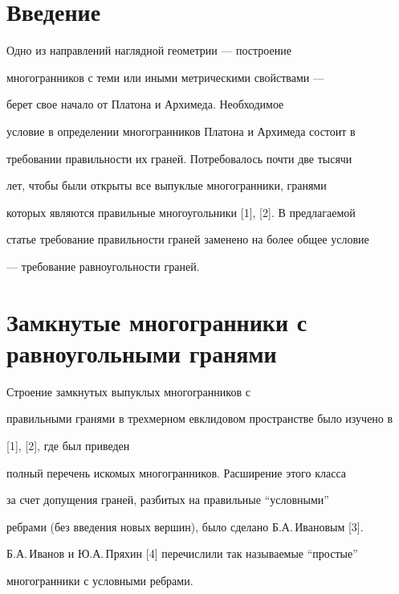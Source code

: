 \label{begin} 


 


\section*{Введение} 


 


Одно из направлений наглядной геометрии --- построение 


многогранников с теми или иными метрическими свойствами --- 


берет свое начало от Платона и Архимеда. Необходимое 


условие в определении многогранников Платона и Архимеда состоит в 


требовании правильности их граней. Потребовалось почти две тысячи 


лет, чтобы были открыты все выпуклые многогранники, гранями 


которых являются правильные многоугольники [1], [2]. В предлагаемой  


статье требование правильности граней заменено на более общее условие 


--- требование равноугольности граней. 


 


\section{Замкнутые многогранники с равноугольными гранями} 


 


Строение замкнутых выпуклых многогранников с 


правильными гранями в трехмерном евклидовом пространстве было изучено в  


[1], [2], где был приведен  


полный перечень искомых многогранников. Расширение этого класса 


за счет допущения граней, разбитых на правильные ``условными'' 


ребрами (без введения новых вершин), было сделано Б.А.\,Ивановым [3]. 


Б.А.\,Иванов и Ю.А.\,Пряхин [4] перечислили так называемые ``простые'' 


многогранники с условными ребрами. 


